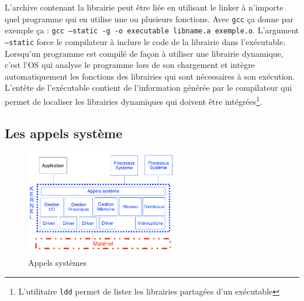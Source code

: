 L'archive contenant la librairie peut être liée en utilisant le linker à n'importe quel programme qui en utilise une ou plusieurs fonctions. Avec \texttt{gcc} ça donne par exemple ça : \texttt{gcc --static -g -o executable libname.a exemple.o}. L'argument \texttt{--static} force le compilateur à inclure le code de la librairie dans l'exécutable. \\

Lorsqu'un programme est compilé de façon à utiliser une librairie dynamique, c'est l'OS qui analyse le programme lors de son chargement et intègre automatiquement les fonctions des librairies qui sont nécessaires à son exécution. L'entête de l'exécutable contient de l'information générée par le compilateur qui permet de localiser les librairies dynamiques qui doivent être intégrées\footnote{L'utilitaire \texttt{ldd} permet de lister les librairies partagées d'un exécutable}.
\subsection{Les appels système}
\begin{figure}[h!]
  \centering\includegraphics[width=0.6\textwidth]{appelssystemes}
  \caption{\label{fig:appelssystemes}Appels systèmes}
\end{figure}

